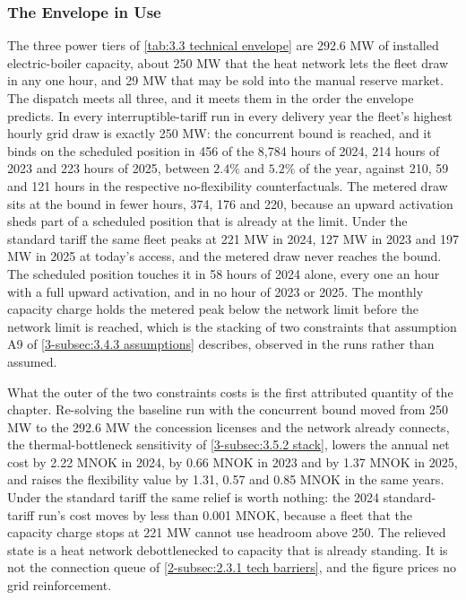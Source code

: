 \subsubsection{The Envelope in Use}
\label{4-subsec:4.0.1 envelope in use}

The three power tiers of \autoref{tab:3.3 technical envelope} are 292.6 MW of installed electric-boiler capacity, about 250 MW that the heat network lets the fleet draw in any one hour, and 29 MW that may be sold into the manual reserve market. The dispatch meets all three, and it meets them in the order the envelope predicts. In every interruptible-tariff run in every delivery year the fleet's highest hourly grid draw is exactly 250 MW: the concurrent bound is reached, and it binds on the scheduled position in 456 of the 8,784 hours of 2024, 214 hours of 2023 and 223 hours of 2025, between $2.4\%$ and $5.2\%$ of the year, against 210, 59 and 121 hours in the respective no-flexibility counterfactuals. The metered draw sits at the bound in fewer hours, 374, 176 and 220, because an upward activation sheds part of a scheduled position that is already at the limit. Under the standard tariff the same fleet peaks at 221 MW in 2024, 127 MW in 2023 and 197 MW in 2025 at today's access, and the metered draw never reaches the bound. The scheduled position touches it in 58 hours of 2024 alone, every one an hour with a full upward activation, and in no hour of 2023 or 2025. The monthly capacity charge holds the metered peak below the network limit before the network limit is reached, which is the stacking of two constraints that assumption A9 of \autoref{3-subsec:3.4.3 assumptions} describes, observed in the runs rather than assumed.

What the outer of the two constraints costs is the first attributed quantity of the chapter. Re-solving the baseline run with the concurrent bound moved from 250 MW to the 292.6 MW the concession licenses and the network already connects, the thermal-bottleneck sensitivity of \autoref{3-subsec:3.5.2 stack}, lowers the annual net cost by 2.22 MNOK in 2024, by 0.66 MNOK in 2023 and by 1.37 MNOK in 2025, and raises the flexibility value by 1.31, 0.57 and 0.85 MNOK in the same years. Under the standard tariff the same relief is worth nothing: the 2024 standard-tariff run's cost moves by less than 0.001 MNOK, because a fleet that the capacity charge stops at 221 MW cannot use headroom above 250. The relieved state is a heat network debottlenecked to capacity that is already standing. It is not the connection queue of \autoref{2-subsec:2.3.1 tech barriers}, and the figure prices no grid reinforcement.


